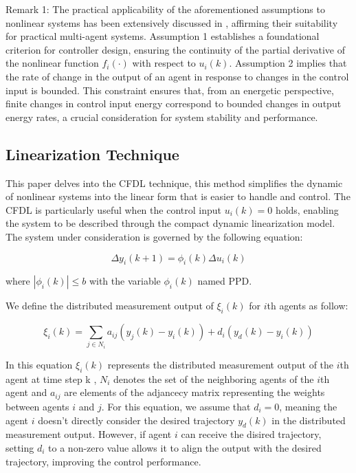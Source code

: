 \documentclass[journal,onecolumn]{IEEEtran}
\begin{document}
Remark 1: The practical applicability of the aforementioned assumptions to nonlinear systems has been extensively discussed in \cite{1}, affirming their suitability for practical multi-agent systems. Assumption 1 establishes a foundational criterion for controller design, ensuring the continuity of the partial derivative of the nonlinear function $f_i(\cdot)$ with respect to $u_i(k)$. Assumption 2 implies that the rate of change in the output of an agent in response to changes in the control input is bounded. This constraint ensures that, from an energetic perspective, finite changes in control input energy correspond to bounded changes in output energy rates, a crucial consideration for system stability and performance.

\subsection{Linearization Technique}

This paper delves into the CFDL technique, this method simplifies the dynamic of nonlinear systems into the linear form that is easier to handle and control. The CFDL is particularly useful when the control input \(u_i(k) = 0\) holds, enabling the system to be described through the compact dynamic linearization model. The system under consideration is governed by the following equation:


\begin{equation}
    \label{model 2}
    \Delta y_i(k+1)=\phi_i(k)\Delta u_i(k)
\end{equation}

where \( | \phi_i(k) | \leq b\) with the variable \(\phi_i(k)\) named PPD.

We define the distributed measurement output of \(\xi_i(k)\) for $i$th agents as follow:

\begin{equation}
    \label{model 3}
    \xi_i(k) = \sum_{j \in N_i} a_{ij}( y_j(k)-y_i(k)) + d_i(y_d(k) - y_i(k ))
\end{equation}

 
In this equation \(\xi_i(k)\) represents the distributed measurement output of the $i$th agent at time step k , \(N_i\) denotes the set of the neighboring agents of the $i$th agent and \(a_{ij}\) are elements of the adjancecy matrix representing the weights between agents \(i\) and \(j\).   
For this equation, we assume that \(d_i = 0\), meaning the agent \(i\) doesn't directly consider the desired trajectory \(y_d(k)\) in the distributed measurement output. However, if agent \(i\) can receive the disired trajectory, setting \(d_i\) to a non-zero value allows it to align the output with the desired trajectory, improving the control performance.
\end{document}
